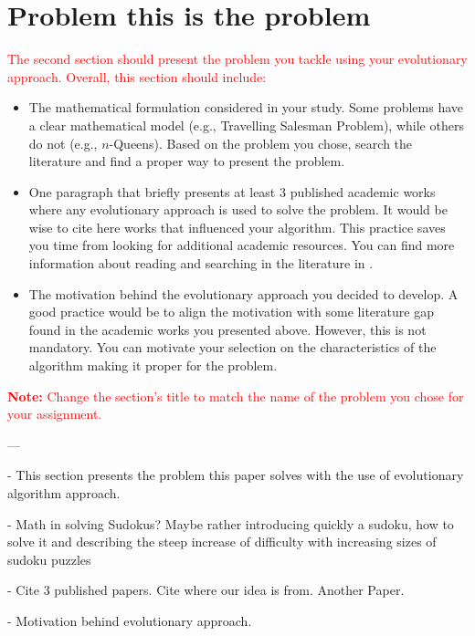 \section{Problem this is the problem}
\label{sec:problem_description}

\textcolor{red}{The second section should present the problem you tackle using your evolutionary approach. Overall, this section should include:}

{\color{red}
\begin{itemize}
    \item The mathematical formulation considered in your study. Some problems have a clear mathematical model (e.g., Travelling Salesman Problem), while others do not (e.g., $n$-Queens). Based on the problem you chose, search the literature and find a proper way to present the problem.
    \item One paragraph that briefly presents at least 3 published academic works where any evolutionary approach is used to solve the problem. It would be wise to cite here works that influenced your algorithm. This practice saves you time from looking for additional academic resources. You can find more information about reading and searching in the literature in \cite{zobel2014reading}.
    \item The motivation behind the evolutionary approach you decided to develop. A good practice would be to align the motivation with some literature gap found in the academic works you presented above. However, this is not mandatory. You can motivate your selection on the characteristics of the algorithm making it proper for the problem.
\end{itemize}
}

\textcolor{red}{\textbf{Note:} Change the section's title to match the name of the problem you chose for your assignment.}

---

- This section presents the problem this paper solves with the use of evolutionary algorithm approach. 

- Math in solving Sudokus? Maybe rather introducing quickly a sudoku, how to solve it and describing the steep increase of difficulty with increasing sizes of sudoku puzzles

- Cite 3 published papers. Cite where our idea is from\cite{Mantere2007}. Another Paper\cite{Amil2019}.

- Motivation behind evolutionary approach.


